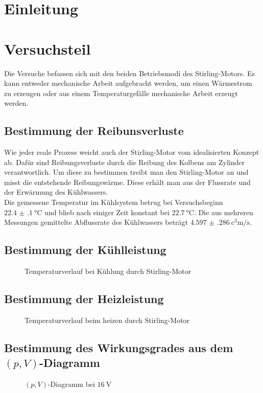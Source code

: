 \section{Einleitung}

\newpage
\section{Versuchsteil}

Die Versuche befassen sich mit den beiden Betriebsmodi des Stirling-Motors. Es kann entweder mechanische Arbeit aufgebracht werden, um einen Wärmestrom zu erzeugen oder aus einem Temperaturgefälle mechanische Arbeit erzeugt werden. 

\subsection{Bestimmung der Reibunsverluste}
Wie jeder reale Prozess weicht auch der Stirling-Motor vom idealisierten Konzept ab. Dafür sind Reibungsverluste durch die Reibung des Kolbens am Zylinder verantwortlich. Um diese zu bestimmen treibt man den Stirling-Motor an und misst die entstehende Reibungswärme. Diese erhält man aus der Flussrate und der Erwärmung des Kühlwassers. \\
Die gemessene Temperatur im Kühlsystem betrug bei Versuchsbeginn $ \SI{22.4(1)}{\degreeCelsius} $ und blieb nach einiger Zeit konstant bei $ \SI{22.7}{\degreeCelsius} $. Die aus mehreren Messungen gemittelte Abflussrate des Kühlwassers beträgt $ \SI{4.597(286)}{\cubic\centi\meter\per\second} $.

\subsection{Bestimmung der Kühlleistung}

\begin{figure}[h!]
	\centering
	
	\caption{Temperaturverlauf bei Kühlung durch Stirling-Motor}
	\label{fig:a2T}
\end{figure}

\subsection{Bestimmung der Heizleistung}

\begin{figure}[h!]
	\centering
	
	\caption{Temperaturverlauf beim heizen durch Stirling-Motor}
	\label{fig:a3T}
\end{figure}

\subsection{Bestimmung des Wirkungsgrades aus dem $ (p,V) $-Diagramm}

\begin{figure}[h!]
	\centering
	
	\caption{$ (p,V) $-Diagramm bei $ \SI{16}{\volt} $}
	\label{fig:pV16}
\end{figure}